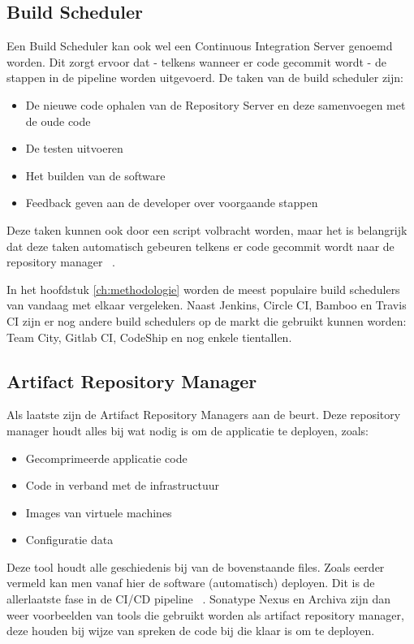         \subsection{Build Scheduler}
        Een Build Scheduler kan ook wel een Continuous Integration Server genoemd worden.
        Dit zorgt ervoor dat - telkens wanneer er code gecommit wordt - de stappen in de pipeline worden uitgevoerd. De taken van de build scheduler zijn: 
        \begin{itemize}
            \item De nieuwe code ophalen van de Repository Server en deze samenvoegen met de oude code
            \item De testen uitvoeren
            \item Het builden van de software
            \item Feedback geven aan de developer over voorgaande stappen
        \end{itemize}
        Deze taken kunnen ook door een script volbracht worden, maar het is belangrijk dat deze taken automatisch gebeuren telkens er code gecommit wordt naar de repository manager ~\autocite{Riti2018}.
    
        In het hoofdstuk \ref{ch:methodologie} worden de meest populaire build schedulers van vandaag met elkaar vergeleken. Naast Jenkins, Circle CI, Bamboo en Travis CI zijn er nog andere build schedulers op de markt die gebruikt kunnen worden: Team City, Gitlab CI, CodeShip en nog enkele tientallen.
        
        
        \subsection{Artifact Repository Manager}
        Als laatste zijn de Artifact Repository Managers aan de beurt. Deze repository manager houdt alles bij wat nodig is om de applicatie te deployen, zoals:
        \begin{itemize}
            \item Gecomprimeerde applicatie code
            \item Code in verband met de infrastructuur
            \item Images van virtuele machines
            \item Configuratie data
        \end{itemize}
        Deze tool houdt alle geschiedenis bij van de bovenstaande files. Zoals eerder vermeld kan men vanaf hier de software (automatisch) deployen. Dit is de allerlaatste fase in de CI/CD pipeline ~\autocite{Skelton2014}.
        Sonatype Nexus en Archiva zijn dan weer voorbeelden van tools die gebruikt worden als artifact repository manager, deze houden bij wijze van spreken de code bij die klaar is om te deployen. 
    
